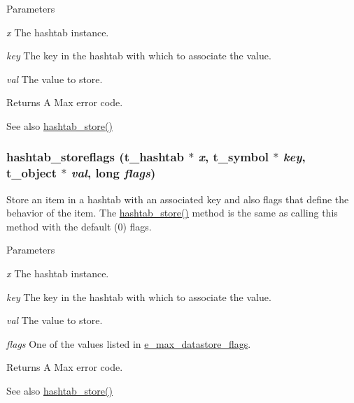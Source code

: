\begin{DoxyParams}{Parameters}
\item[{\em x}]The hashtab instance. \item[{\em key}]The key in the hashtab with which to associate the value. \item[{\em val}]The value to store. \end{DoxyParams}
\begin{DoxyReturn}{Returns}
A Max error code. 
\end{DoxyReturn}
\begin{DoxySeeAlso}{See also}
\hyperlink{group__hashtab_gaa26ebe9ba21e84dd0dbb8d5aed12e5a1}{hashtab\_\-store()} 
\end{DoxySeeAlso}
\hypertarget{group__hashtab_gab09bf88c81aeb3d71b6661f20989603d}{
\subsubsection[{hashtab\_\-storeflags}]{ hashtab\_\-storeflags ({\bf t\_\-hashtab} $\ast$ {\em x}, \/  {\bf t\_\-symbol} $\ast$ {\em key}, \/  {\bf t\_\-object} $\ast$ {\em val}, \/  long {\em flags})}}
\label{group__hashtab_gab09bf88c81aeb3d71b6661f20989603d}


Store an item in a hashtab with an associated key and also flags that define the behavior of the item. The \hyperlink{group__hashtab_gaa26ebe9ba21e84dd0dbb8d5aed12e5a1}{hashtab\_\-store()} method is the same as calling this method with the default (0) flags.


\begin{DoxyParams}{Parameters}
\item[{\em x}]The hashtab instance. \item[{\em key}]The key in the hashtab with which to associate the value. \item[{\em val}]The value to store. \item[{\em flags}]One of the values listed in \hyperlink{group__datastore_gaa858d4b3815076d79624c39d9ca59348}{e\_\-max\_\-datastore\_\-flags}. \end{DoxyParams}
\begin{DoxyReturn}{Returns}
A Max error code. 
\end{DoxyReturn}
\begin{DoxySeeAlso}{See also}
\hyperlink{group__hashtab_gaa26ebe9ba21e84dd0dbb8d5aed12e5a1}{hashtab\_\-store()} 
\end{DoxySeeAlso}
